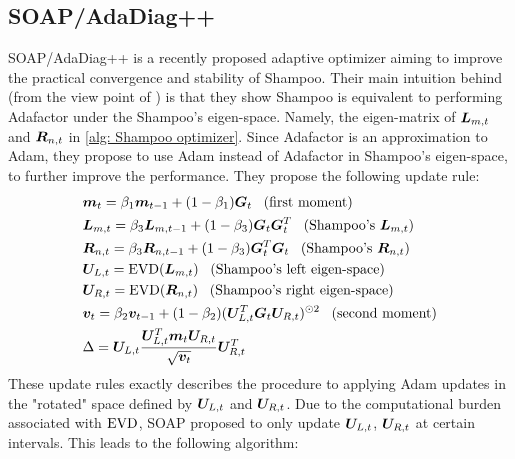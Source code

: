 \subsection{SOAP/AdaDiag++}
\label{subapp: SOAP}
SOAP/AdaDiag++ \citep{vyas2024soap, anonymous2024improving} is a recently proposed adaptive optimizer aiming to improve the practical convergence and stability of Shampoo. Their main intuition behind (from the view point of \cite{vyas2024soap}) is that they show Shampoo is equivalent to performing Adafactor \citep{shazeer2018adafactor} under the Shampoo's eigen-space. Namely, the eigen-matrix of ${\bm{L}}_{m,t}$ and ${\bm{R}}_{n,t}$ in \cref{alg: Shampoo optimizer}. Since Adafactor is an approximation to Adam, they propose to use Adam instead of Adafactor in Shampoo's eigen-space, to further improve the performance. They propose the following update rule: 
\begin{align}
    &{\bm{m}}_{t} = \beta_1{\bm{m}}_{t-1}+(1-\beta_1){\bm{G}}_t\;\;\; (\text{first moment})\nonumber\\
    &{\bm{L}}_{m,t} = \beta_3{\bm{L}}_{m,t-1}+(1-\beta_3){\bm{G}}_t{\bm{G}}_t^T\;\;\;(\text{Shampoo's }{\bm{L}}_{m,t})\nonumber\\
    & {\bm{R}}_{n,t} = \beta_3{\bm{R}}_{n,t-1} + (1-\beta_3) {\bm{G}}_t^T{\bm{G}}_t\;\;\;(\text{Shampoo's }{\bm{R}}_{n,t})\nonumber\\
    & {\bm{U}}_{L,t} = \operatorname{EVD}({\bm{L}}_{m,t})\nonumber \;\;\;(\text{Shampoo's left eigen-space})\\
    & {\bm{U}}_{R,t} = \operatorname{EVD}({\bm{R}}_{n,t})\nonumber \;\;\; (\text{Shampoo's right eigen-space})\\
    & {\bm{v}}_t = \beta_2{\bm{v}}_{t-1}+(1-\beta_2)({\bm{U}}_{L,t}^T{\bm{G}}_t{\bm{U}}_{R,t})^{\odot 2}\;\;\;(\text{second moment})\nonumber\\
    &\Delta = {\bm{U}}_{L,t}\frac{{\bm{U}}_{L,t}^T{\bm{m}}_{t}{\bm{U}}_{R,t}}{\sqrt{{\bm{v}}_t}}{\bm{U}}_{R,t}^T
\label{eq: practical soap updates}    
\end{align}
These update rules exactly describes the procedure to applying Adam updates in the "rotated" space defined by ${\bm{U}}_{L,t}$ and ${\bm{U}}_{R,t}$. Due to the computational burden associated with $\operatorname{EVD}$, SOAP proposed to only update ${\bm{U}}_{L,t}$, ${\bm{U}}_{R,t}$ at certain intervals. This leads to the following algorithm:
